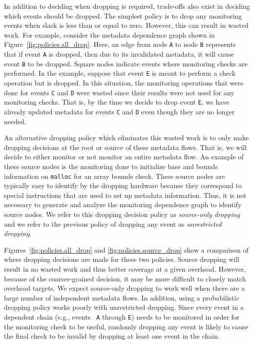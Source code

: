 In addition to deciding when dropping is required, trade-offs also exist in
deciding which events should be dropped.  The simplest policy is to drop any
monitoring events when slack is less than or equal to zero.  However, this can
result in wasted work. For example, consider the metadata dependence graph
shown in Figure~\ref{fig:policies.all_drop}. Here, an edge from node {\tt A} to
node {\tt B} represents that if event {\tt A} is dropped, then due to its
invalidated metadata, it will cause event {\tt B} to be dropped. Square nodes
indicate events where monitoring checks are performed. In the example, suppose
that event {\tt E} is meant to perform a check operation but is dropped.  In
this situation, the monitoring operations that were done for events {\tt C} and
{\tt D} were wasted since their results were not used for any monitoring
checks.  That is, by the time we decide to drop event {\tt E}, we have already
updated metadata for events {\tt C} and {\tt D} even though they are no longer
needed.

An alternative dropping policy which eliminates this wasted work is to only
make dropping decisions at the root or source of these metadata flows. That is,
we will decide to either monitor or not monitor an entire metadata flow. An
example of these source nodes is the monitoring done to initialize base and
bounds information on {\tt malloc} for an array bounds check. These source
nodes are typically easy to identify by the dropping hardware because they
correspond to special instructions that are used to set up metadata
information. Thus, it is not necessary to generate and analyze the monitoring
dependence graph to identify source nodes. We refer to this dropping decision
policy as \emph{source-only
dropping} and we refer to the previous policy of dropping any event as
\emph{unrestricted dropping}.

Figures~\ref{fig:policies.all_drop} and \ref{fig:policies.source_drop} show a
comparison of where dropping decisions are made for these two policies. Source
dropping will
result in no wasted work and thus better coverage at a given overhead. However, because of the coarser-grained decision, it
may be more difficult to closely match overhead targets. We expect source-only dropping 
to work well when there are a large number of independent metadata flows.
In addition, using a probabilistic dropping policy works poorly with
unrestricted dropping. Since every event in a dependent chain (e.g., events {\tt
A} through {\tt E}) needs to be monitored in order for the monitoring check to
be useful, randomly dropping any event is likely to cause the final check to be
invalid by dropping at least one event in the chain.


